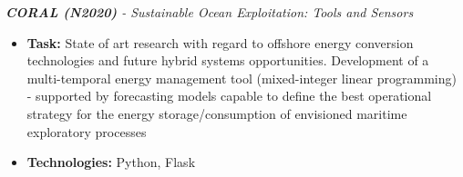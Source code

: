 \documentclass{mycv}
\begin{document}
\begin{myitemize}
	\vspace{0.15cm}	
	\item \textit{\textbf{CORAL (N2020)} - Sustainable Ocean Exploitation: Tools and Sensors}
	\begin{itemize}
		\item \textbf{Task:} State of art research with regard to offshore energy conversion technologies and future hybrid systems opportunities. Development of a multi-temporal energy management tool (mixed-integer linear programming) - supported by forecasting models capable to define the best operational strategy for the energy storage/consumption of envisioned maritime exploratory processes
		\item \textbf{Technologies:} Python, Flask
	\end{itemize}

		
\end{myitemize}


\vspace{-0.2cm}
\end{document}
